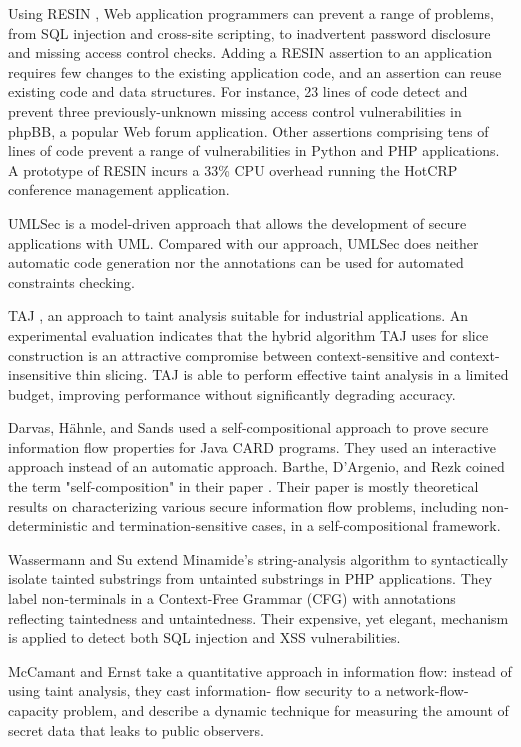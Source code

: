 Using RESIN \cite{ref_63_yip2009improving}, Web application programmers can prevent a range
of problems, from SQL injection and cross-site scripting, to inadvertent password disclosure and missing access control checks. Adding
a RESIN assertion to an application requires few changes to the
existing application code, and an assertion can reuse existing code
and data structures. For instance, 23 lines of code detect and prevent
three previously-unknown missing access control vulnerabilities in
phpBB, a popular Web forum application. Other assertions comprising tens of lines of code prevent a range of vulnerabilities in Python
and PHP applications. A prototype of RESIN incurs a 33\% CPU
overhead running the HotCRP conference management application.

UMLSec \cite{ref_33_juerjens:secure} is a model-driven approach that allows the
development of secure applications with UML. Compared with
our approach, UMLSec does neither automatic code
generation nor the annotations can be used for automated
constraints checking.

TAJ \cite{ref_100_tripp2009taj}, an approach to taint analysis suitable for industrial applications. An experimental evaluation indicates that
the hybrid algorithm TAJ uses for slice construction is an attractive
compromise between context-sensitive and context-insensitive
thin slicing. TAJ is able to perform effective taint analysis in a limited budget, improving performance without significantly degrading accuracy.

Darvas, H{\"a}hnle, and Sands \cite{ref_70_darvas2005theorem} used a self-compositional approach to prove secure information flow properties for Java CARD programs. They used an interactive approach instead of an automatic approach. Barthe, D'Argenio, and Rezk coined the term "self-composition" in their paper \cite{ref_71_barthe2004secure}. Their paper is mostly theoretical results on characterizing various secure information flow problems, including
non-deterministic and termination-sensitive cases, in a self-compositional framework.

Wassermann and Su extend Minamide's string-analysis algorithm
\cite{ref_102_minamide2005static} to syntactically isolate tainted substrings from untainted
substrings in PHP applications. They label non-terminals in a
Context-Free Grammar (CFG) with annotations reflecting taintedness
and untaintedness. Their expensive, yet elegant, mechanism
is applied to detect both SQL injection and XSS vulnerabilities.

McCamant and Ernst \cite{ref_101_mccamant2008quantitative} take a quantitative approach in information
flow: instead of using taint analysis, they cast information-
flow security to a network-flow-capacity problem, and describe a
dynamic technique for measuring the amount of secret data that
leaks to public observers.

